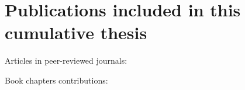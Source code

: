 \chapter*{Publications included in this cumulative thesis}
\label{ch:ownPublications}

\noindent
Articles in peer-reviewed journals:
\begin{refsection}[ownpubs]
  \small%
  \nocite{*}
  \printbibliography[heading=none,type=article]
\end{refsection}

\noindent
Book chapters contributions:
\begin{refsection}[ownpubs]
  \small%
  \nocite{*}
  \printbibliography[heading=none,type=incollection]
\end{refsection}

